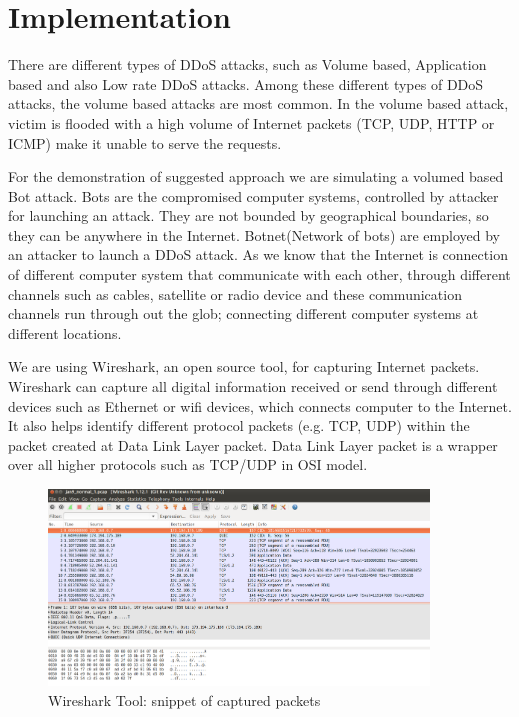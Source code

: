 \documentclass[12pt,oneside,a4paper]{article}
\begin{document}
\section{Implementation}

There are different types of DDoS attacks, such as Volume based, Application based and also Low rate DDoS attacks. Among these different types of DDoS attacks, the volume based attacks are most common. In the volume based attack, victim is flooded with a high volume of Internet packets (TCP, UDP, HTTP or ICMP) make it unable to serve the requests.

For the demonstration of suggested approach we are simulating a volumed based Bot attack. Bots are the compromised computer systems, controlled by attacker for launching an attack. They are not bounded by geographical boundaries, so they can be anywhere in the Internet. Botnet(Network  of bots) are employed by an attacker to launch a DDoS attack. As we know that the Internet is connection of different computer system that communicate with each other, through different channels such as cables, satellite or radio device and these communication channels run through out the glob; connecting different computer systems at different locations.

We are using Wireshark, an open source tool, for capturing Internet packets. Wireshark can capture all digital information received or send through different devices such as Ethernet or wifi devices, which connects computer to the Internet. It also helps identify different protocol packets (e.g. TCP, UDP) within the packet created at Data Link Layer packet. Data Link Layer packet is a wrapper over all higher protocols such as TCP/UDP in OSI model.\par

\begin{figure}[H]
\centering
\includegraphics[width=0.90\textwidth]{Wireshark_Tools.png}
\caption{Wireshark Tool: snippet of captured packets} \label{fig:wireshark}
\end{figure}
\end{document}
